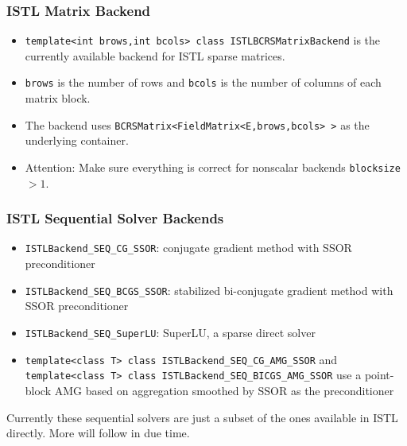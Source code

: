 \begin{frame}
  \frametitle{ISTL Matrix Backend}
  \begin{itemize} 
    \item \lstinline!template<int brows,int bcols> class ISTLBCRSMatrixBackend!
      is the currently available backend for ISTL sparse
      matrices.
    \item \lstinline!brows! is the number of rows and \lstinline!bcols!
      is the number of columns of each matrix block.
  \item The backend uses
    \lstinline!BCRSMatrix<FieldMatrix<E,brows,bcols> >! as the
    underlying container.
  \item Attention: Make sure everything is correct for nonscalar backends
    \lstinline!blocksize!$>1$.
  \end{itemize}
\end{frame}
\begin{frame}[fragile]
  \frametitle{ISTL Sequential Solver Backends}
    \begin{itemize}
    \item \lstinline!ISTLBackend_SEQ_CG_SSOR!:  conjugate gradient method with SSOR preconditioner
    \item \lstinline!ISTLBackend_SEQ_BCGS_SSOR!: stabilized bi-conjugate gradient
      method with SSOR preconditioner
    \item \lstinline!ISTLBackend_SEQ_SuperLU!: SuperLU, a sparse
      direct solver
    \item \lstinline!template<class T> class ISTLBackend_SEQ_CG_AMG_SSOR! and
      \lstinline!template<class T> class ISTLBackend_SEQ_BICGS_AMG_SSOR! 
      use a point-block AMG based on aggregation smoothed by SSOR as
      the preconditioner
    \end{itemize}
    Currently these sequential solvers are just a subset of the ones
  available in ISTL directly. More will follow in due time.
\end{frame}



